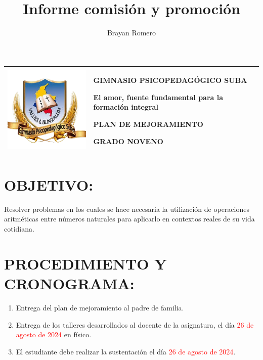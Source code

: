 \documentclass[spanish,12pt,a4paper]{article}
\title{Informe comisión y promoción}
\author{Brayan Romero}
\begin{document}
	
	\begin{center}
		\begin{tabular}{|p{3cm}|p{12cm}|}
			\hline
			\vspace{0.05cm}
			\centering
			\includegraphics[scale=0.35]{logo.png}
			&
			\begin{center}
				\textbf{GIMNASIO PSICOPEDAGÓGICO SUBA}
				
				\vspace{0.1cm}
				El amor, fuente fundamental para la formación integral
				
				\vspace{0.1cm}
				\textbf{PLAN DE MEJORAMIENTO}
				
				\vspace{0.1cm}
				\textbf{GRADO NOVENO}
				
			\end{center}
			\\
			\hline
			
			
		\end{tabular}
		
	\end{center}	
	
	\section*{OBJETIVO:}
	Resolver problemas en los cuales se hace necesaria la utilización de operaciones aritméticas entre números naturales para aplicarlo en contextos reales de su vida cotidiana. 
	
	\section*{PROCEDIMIENTO Y CRONOGRAMA:}
	\begin{enumerate}
		\item Entrega del plan de mejoramiento al padre de familia.
		\item Entrega de los talleres desarrollados al docente de la asignatura, el día \textcolor{red}{26 de agosto de 2024} en físico.
		\item El estudiante debe realizar la sustentación el día \textcolor{red}{26 de agosto de 2024}.
	\end{enumerate}
	
\end{document}
